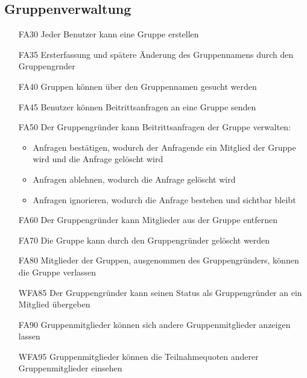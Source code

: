 \documentclass{scrartcl}
\begin{document}
	\subsection{Gruppenverwaltung}
	\begin{itemize}
	\hypertarget{FA30}{}
		\item[FA30] Jeder Benutzer kann eine Gruppe erstellen
		\hypertarget{FA35}{}
		\item[FA35] Ersterfassung und spätere Änderung des Gruppennamens durch den \gls{Gruppengrnder}
		\hypertarget{FA40}{}
		\item[FA40] Gruppen können über den Gruppennamen gesucht werden
		\hypertarget{FA45}{}
		\item[FA45] Benutzer können Beitrittsanfragen an eine Gruppe senden
		\hypertarget{FA50}{}
		\item[FA50] Der Gruppengründer kann Beitrittsanfragen der Gruppe verwalten:
		\begin{itemize}
			\item Anfragen bestätigen, wodurch der Anfragende ein \gls{Mitglied} der Gruppe wird und die Anfrage gelöscht wird
		\end{itemize}
		\begin{itemize}
			\item Anfragen ablehnen, wodurch die Anfrage gelöscht wird
		\end{itemize}
		\begin{itemize}
			\item Anfragen ignorieren, wodurch die Anfrage bestehen und sichtbar bleibt
		\end{itemize}
		\hypertarget{FA60}{}
		\item[FA60] Der Gruppengründer kann Mitglieder aus der Gruppe entfernen
		\hypertarget{FA70}{}
		\item[FA70] Die Gruppe kann durch den Gruppengründer gelöscht werden
		\hypertarget{FA80}{}
		\item[FA80] Mitglieder der Gruppen, ausgenommen des Gruppengründers, können die Gruppe verlassen
		\hypertarget{WFA85}{}
		\item[WFA85] Der Gruppengründer kann seinen Status als Gruppengründer an ein Mitglied übergeben
		\hypertarget{FA90}{}
		\item[FA90] Gruppenmitglieder können sich andere Gruppenmitglieder anzeigen lassen
		\hypertarget{WFA95}{}
		\item[WFA95] Gruppenmitglieder können die Teilnahmequoten anderer Gruppenmitglieder einsehen
		
	\end{itemize}
	
\end{document}
